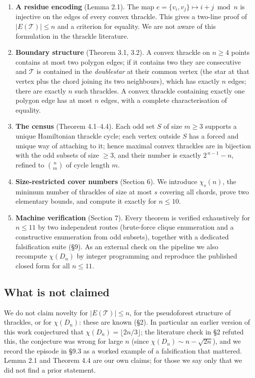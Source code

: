 \documentclass[11pt,a4paper]{article}
\theoremstyle{definition}
\theoremstyle{plain}
\newcommand{\Thr}{\mathcal{T}}
\begin{document}
\begin{enumerate}[leftmargin=*,itemsep=2pt]
\item \textbf{A residue encoding} (Lemma 2.1).  The map
$e=\{v_i,v_j\}\mapsto i+j \bmod n$ is injective on the edges of every convex
thrackle.  This gives a two-line proof of $|E(\Thr)|\le n$ and a criterion for
equality.  We are not aware of this formulation in the thrackle literature.
\item \textbf{Boundary structure} (Theorem 3.1, 3.2).  A convex thrackle on
$n\ge4$ points contains at most two polygon edges; if it contains two they are
consecutive and $\Thr$ is contained in the \emph{doublestar} at their common
vertex (the star at that vertex plus the chord joining its two neighbours),
which has exactly $n$ edges; there are exactly $n$ such thrackles.  A convex
thrackle containing exactly one polygon edge has at most $n$ edges, with a
complete characterisation of equality.
\item \textbf{The census} (Theorem 4.1--4.4).  Each odd set $S$ of size $m\ge3$
supports a unique Hamiltonian thrackle cycle; each vertex outside $S$ has a
forced and unique way of attaching to it; hence maximal convex thrackles are in
bijection with the odd subsets of size $\ge3$, and their number is exactly
$2^{\,n-1}-n$, refined to $\binom nm$ of cycle length $m$.
\item \textbf{Size-restricted cover numbers} (Section 6).  We introduce
$\chi_s(n)$, the minimum number of thrackles of size at most $s$ covering all
chords, prove two elementary bounds, and compute it exactly for $n\le 10$.
\item \textbf{Machine verification} (Section 7).  Every theorem is verified
exhaustively for $n\le11$ by two independent routes (brute-force clique
enumeration and a constructive enumeration from odd subsets), together with a
dedicated falsification suite (§9).  As an external check on the pipeline we
also recompute $\chi(D_n)$ by integer programming and reproduce the published
closed form for all $n\le11$.
\end{enumerate}

\subsection{What is not claimed}

We do not claim novelty for $|E(\Thr)|\le n$, for the pseudoforest structure of
thrackles, or for $\chi(D_n)$: these are known (§2).  In particular an earlier
version of this work conjectured that $\chi(D_n)=\lfloor 2n/3\rfloor$; the
literature check in §2 refuted this, the conjecture was wrong for large $n$
(since $\chi(D_n)\sim n-\sqrt{2n}$), and we record the episode in
§9.3 as a worked example of a falsification that mattered.  Lemma 2.1 and
Theorem 4.4 are our own claims; for those we say only that we did not find a
prior statement.
\end{document}
